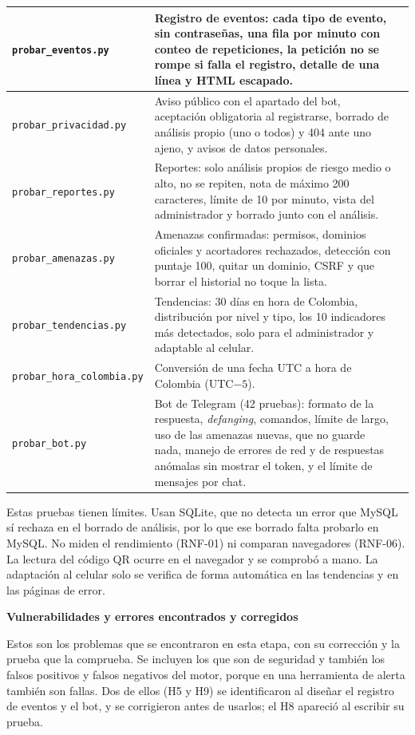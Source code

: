 \documentclass[journal,onecolumn,12pt,draftclsnofoot]{IEEEtran}
\newcommand{\apartado}[1]{\par\medskip\noindent\textbf{#1}\par\smallskip}
\begin{document}
\begin{longtable}{|>{\raggedright\arraybackslash}p{}|>{\raggedright\arraybackslash}p{}|>{\raggedright\arraybackslash}p{}|}
\texttt{probar\_eventos.py} & Registro de eventos: cada tipo de evento, sin contraseñas, una fila por minuto con conteo de repeticiones, la petición no se rompe si falla el registro, detalle de una línea y HTML escapado. & 16 \\ \hline
\texttt{probar\_privacidad.py} & Aviso público con el apartado del bot, aceptación obligatoria al registrarse, borrado de análisis propio (uno o todos) y 404 ante uno ajeno, y avisos de datos personales. & 12 \\ \hline
\texttt{probar\_reportes.py} & Reportes: solo análisis propios de riesgo medio o alto, no se repiten, nota de máximo 200 caracteres, límite de 10 por minuto, vista del administrador y borrado junto con el análisis. & 14 \\ \hline
\texttt{probar\_amenazas.py} & Amenazas confirmadas: permisos, dominios oficiales y acortadores rechazados, detección con puntaje 100, quitar un dominio, CSRF y que borrar el historial no toque la lista. & 11 \\ \hline
\texttt{probar\_tendencias.py} & Tendencias: 30 días en hora de Colombia, distribución por nivel y tipo, los 10 indicadores más detectados, solo para el administrador y adaptable al celular. & 7 \\ \hline
\texttt{probar\_hora\_colombia.py} & Conversión de una fecha UTC a hora de Colombia (UTC$-5$). & 1 \\ \hline
\texttt{probar\_bot.py} & Bot de Telegram (42 pruebas): formato de la respuesta, \emph{defanging}, comandos, límite de largo, uso de las amenazas nuevas, que no guarde nada, manejo de errores de red y de respuestas anómalas sin mostrar el token, y el límite de mensajes por chat. & 42 \\ \hline
\end{longtable}
\endgroup

Estas pruebas tienen límites. Usan SQLite, que no detecta un error que MySQL sí rechaza en el borrado de análisis, por lo que ese borrado falta probarlo en MySQL. No miden el rendimiento (RNF-01) ni comparan navegadores (RNF-06). La lectura del código QR ocurre en el navegador y se comprobó a mano. La adaptación al celular solo se verifica de forma automática en las tendencias y en las páginas de error.

\apartado{Vulnerabilidades y errores encontrados y corregidos}

Estos son los problemas que se encontraron en esta etapa, con su corrección y la prueba que la comprueba. Se incluyen los que son de seguridad y también los falsos positivos y falsos negativos del motor, porque en una herramienta de alerta también son fallas. Dos de ellos (H5 y H9) se identificaron al diseñar el registro de eventos y el bot, y se corrigieron antes de usarlos; el H8 apareció al escribir su prueba.
\end{document}
